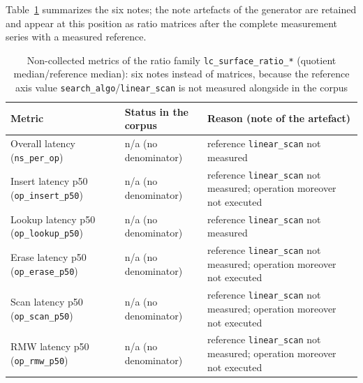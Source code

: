 \ifPlatzhalterAlsTabelle%
Table~\ref{tab:t3:ratio} summarizes the six notes; the note artefacts of the generator are retained
and appear at this position as ratio matrices after the complete measurement series with a measured
reference.
\begin{table}[!htbp]
\centering
\small
\begin{tabular}{@{}>{\raggedright\arraybackslash}p{4.4cm}>{\raggedright\arraybackslash}p{3.0cm}>{\raggedright\arraybackslash}p{7.0cm}@{}}
\toprule
Metric & Status in the corpus & Reason (note of the artefact) \\
\midrule
Overall latency (\texttt{ns\_per\_op}) & n/a (no denominator) & reference \texttt{linear\_scan} not measured \\
Insert latency p50 (\texttt{op\_insert\_p50}) & n/a (no denominator) & reference \texttt{linear\_scan} not measured; operation moreover not executed \\
Lookup latency p50 (\texttt{op\_lookup\_p50}) & n/a (no denominator) & reference \texttt{linear\_scan} not measured \\
Erase latency p50 (\texttt{op\_erase\_p50}) & n/a (no denominator) & reference \texttt{linear\_scan} not measured; operation moreover not executed \\
Scan latency p50 (\texttt{op\_scan\_p50}) & n/a (no denominator) & reference \texttt{linear\_scan} not measured; operation moreover not executed \\
RMW latency p50 (\texttt{op\_rmw\_p50}) & n/a (no denominator) & reference \texttt{linear\_scan} not measured; operation moreover not executed \\
\bottomrule
\end{tabular}
\caption{Non-collected metrics of the ratio family \texttt{lc\_surface\_ratio\_*} (quotient
median/reference median): six notes instead of matrices, because the reference axis value
\texttt{search\_algo}/\texttt{linear\_scan} is not measured alongside in the corpus}%
\label{tab:t3:ratio}
\end{table}
\else
{}
